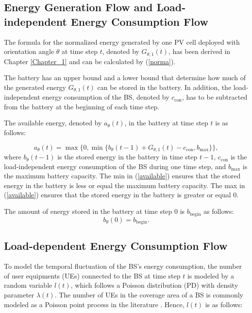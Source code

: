 \subsection{Energy Generation Flow and Load-independent Energy Consumption Flow}\label{energy}


The formula for the normalized energy generated by one PV cell deployed with orientation angle $\theta$ at time step $t$, denoted by $G_{\theta,1}(t)$, has been derived in Chapter \ref{Chapter_1} and can be calculated by (\ref{norma}). 


The battery has an upper bound and a lower bound that determine how much of the generated energy $G_{\theta,1}(t)$ can be stored in the battery. In addition, the load-independent energy consumption of the BS, denoted by $c_{\mathrm{con}}$, has to be subtracted from the battery at the beginning of each time step. 


The available energy, denoted by $a_{\theta}(t)$, in the battery at time step $t$ is as follows:


\begin{equation}\label{available}
a_{\theta}(t)=\max\{0,\min\{b_\theta(t-1)+G_{\theta,1}(t)-c_{\mathrm{con}},b_{\max}\}\},
\end{equation}
\noindent
where $b_{\theta}(t-1)$ is the stored energy in the battery in time step $t-1$, $c_{\mathrm{con}}$ is the load-independent energy consumption of the BS during one time step, and $b_{\max}$ is the maximum battery capacity. The min in (\ref{available}) ensures that the stored energy in the battery is less or equal the maximum battery capacity. The max in (\ref{available}) ensures that the stored energy in the battery is greater or equal $0$. 

The amount of energy stored in the battery at time step $0$ is $b_{\mathrm{begin}}$ as follows:
\begin{equation}
 b_{\theta}(0)=b_{\mathrm{begin}}.
\end{equation}


\subsection{Load-dependent Energy Consumption Flow}\label{traffic}

To model the temporal fluctuation of the BS's energy consumption, the number of user equipments (UEs) connected to the BS at time step $t$ is modeled by a random variable $l(t)$, which follows a Poisson distribution (PD) with density parameter $\lambda(t)$. The number of UEs in the coverage area of a BS is commonly modeled as a Poisson point process in the literature \cite{poisson, baccell00403039, NET-015}. Hence, $l(t)$ is as follows:

